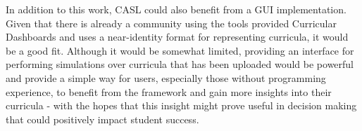 \documentclass[botnum, fleqn]{unmeethesis}
\begin{document}
  In addition to this work, CASL could also benefit from a GUI implementation. Given that there is already a community using the tools provided Curricular Dashboards and uses a near-identity format for representing curricula, it would be a good fit. Although it would be somewhat limited, providing an interface for performing simulations over curricula that has been uploaded would be powerful and provide a simple way for users, especially those without programming experience, to benefit from the framework and gain more insights into their curricula - with the hopes that this insight might prove useful in decision making that could positively impact student success.

\vspace{4\baselineskip}\vspace{-\parskip} %
\footnotesize %

\end{document}
